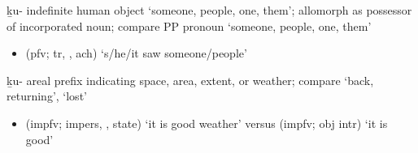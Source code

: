 \begin{morphdesc}[resume*=alphalist]
\item[ḵu-]\label{m:ḵu-indef}
	indefinite human object ‘someone, people, one, them’;
	allomorph  as possessor of incorporated noun;
	compare PP pronoun  ‘someone, people, one, them’
	\begin{itemize}
	\item	{} (pfv; tr, , ach) ‘s/he/it saw someone/people’
	\end{itemize}

\item[ḵu-]\label{m:ḵu-areal}
	areal prefix indicating space, area, extent, or weather;
	compare  ‘back, returning’,  ‘lost’
	\begin{itemize}
	\item	{} (impfv; impers, ,  state) ‘it is good weather’\newline
		versus  (impfv; obj intr) ‘it is good’
	\end{itemize}


\end{morphdesc}
